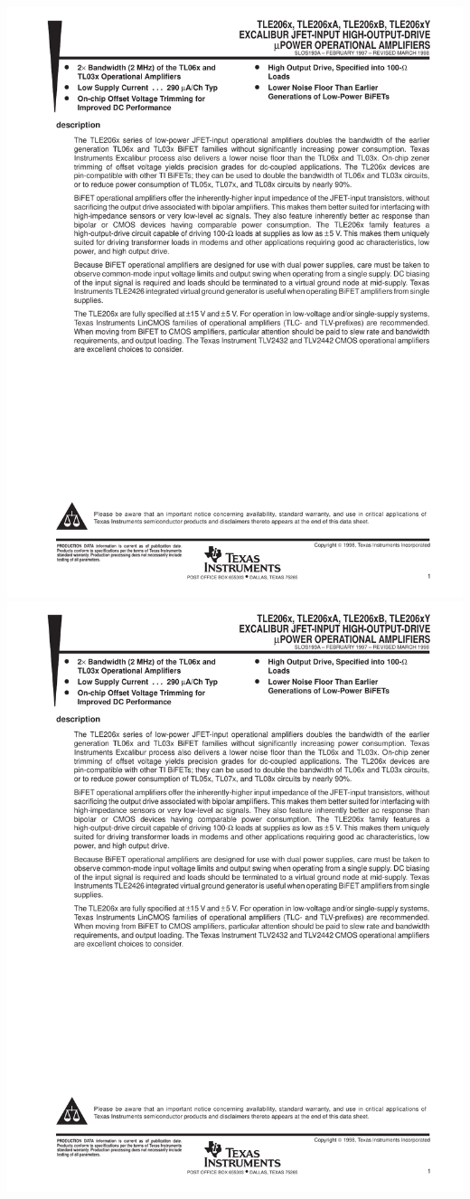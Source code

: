 \begin{center}
\includegraphics[scale=0.9, page=4]{tle2061.pdf}
\newpage
\includegraphics[scale=0.9, page=5]{tle2061.pdf}

\end{center}
